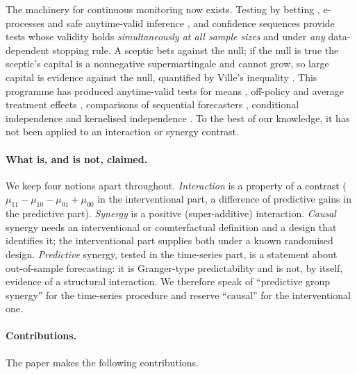 \documentclass[pdflatex,sn-mathphys-ay]{sn-jnl}%
\theoremstyle{thmstyleone}%
\theoremstyle{thmstyletwo}%
\theoremstyle{thmstylethree}%
\begin{document}
The machinery for continuous monitoring now exists. Testing by
betting \citep{shafer2021}, e-processes and safe anytime-valid inference
\citep{ramdas2023,grunwald2024}, and confidence sequences \citep{howard2021}
provide tests whose validity holds \emph{simultaneously at all sample sizes} and
under \emph{any} data-dependent stopping rule. A sceptic bets against the null; if
the null is true the sceptic's capital is a nonnegative supermartingale and cannot
grow, so large capital is evidence against the null, quantified by Ville's inequality
\citep{ville1939}. This programme has produced anytime-valid tests for means
\citep{waudbysmith2024}, off-policy and average treatment effects
\citep{waudbysmith2024ope}, comparisons of sequential forecasters
\citep{choe2024}, conditional independence \citep{grunwald2024ci} and kernelised
independence \citep{podkopaev2023}. To the best of our knowledge, it has not
been applied to an interaction or synergy contrast.

\paragraph{What is, and is not, claimed.} We keep four notions apart throughout.
\emph{Interaction} is a property of a contrast ($\mu_{11}-\mu_{10}-\mu_{01}+\mu_{00}$ in
the interventional part, a difference of predictive gains in the predictive part).
\emph{Synergy} is a positive (super-additive) interaction. \emph{Causal} synergy needs
an interventional or counterfactual definition and a design that identifies it; the
interventional part supplies both under a known randomised design. \emph{Predictive}
synergy, tested in the time-series part, is a statement about out-of-sample
forecasting: it is Granger-type predictability and is not, by itself, evidence of a
structural interaction. We therefore speak of ``predictive group synergy'' for the
time-series procedure and reserve ``causal'' for the interventional one.

\paragraph{Contributions.} The paper makes the following contributions.
\end{document}
